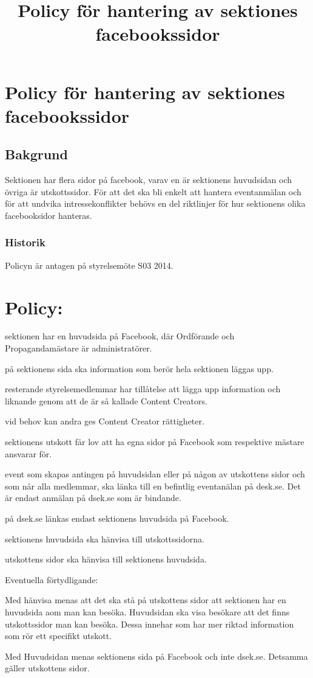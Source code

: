 \documentclass{dsekkallelse}
\title{Policy för hantering av sektiones facebookssidor}
\author{}
\begin{document}
\section{Policy för hantering av sektiones facebookssidor}

\subsection{Bakgrund}

Sektionen har flera sidor på facebook, varav en är sektionens huvudsidan och övriga är utskottssidor. För att det ska bli enkelt att hantera eventanmälan och för att undvika intressekonflikter behövs en del riktlinjer för hur sektionens olika facebooksidor hanteras.

\subsubsection{Historik}
Policyn är antagen på styrelsemöte S03 2014.


\section{Policy:} 
\begin{attlista}
	\item sektionen har en huvudsida på Facebook, där Ordförande och Propagandamästare är
administratörer.
\item på sektionens sida ska information som berör hela sektionen läggas upp.
\item resterande styrelsemedlemmar har tillåtelse att lägga upp information och liknande genom att de är så kallade Content Creators.
\item vid behov kan andra ges Content Creator rättigheter.
\item  sektionens utskott får lov att ha egna sidor på Facebook som respektive mästare ansvarar
för.
\item event som skapas antingen på huvudsidan eller på någon av utskottens sidor och som
når alla medlemmar, ska länka till en befintlig eventanälan på desk.se. Det är endast anmälan på dsek.se som är bindande.
\item på dsek.se länkas endast sektionens huvudsida på Facebook.
\item sektionens huvudsida ska hänvisa till utskottssidorna.
\item utskottens sidor ska hänvisa till sektionens huvudsida.

\end{attlista}

Eventuella förtydligande:

Med hänvisa menas att det ska stå på utskottens sidor att sektionen har en huvudsida aom man
kan besöka. Huvudsidan ska visa besökare att det finns utskottssidor man kan besöka. Dessa
innehar som har mer riktad information som rör ett specifikt utskott.

Med Huvudsidan menas sektionens sida på Facebook och inte dsek.se. Detsamma gäller utskottens sidor.
	
\end{document}
